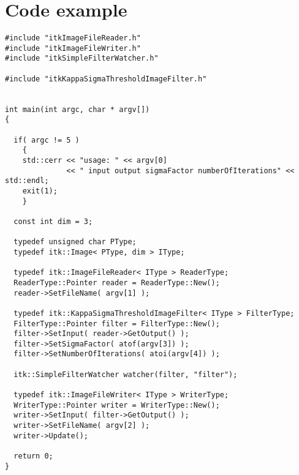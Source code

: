\documentclass{InsightArticle}
\begin{document}
\section{Code example}

\small \begin{verbatim}
#include "itkImageFileReader.h"
#include "itkImageFileWriter.h"
#include "itkSimpleFilterWatcher.h"

#include "itkKappaSigmaThresholdImageFilter.h"


int main(int argc, char * argv[])
{

  if( argc != 5 )
    {
    std::cerr << "usage: " << argv[0]
              << " input output sigmaFactor numberOfIterations" << std::endl;
    exit(1);
    }

  const int dim = 3;
  
  typedef unsigned char PType;
  typedef itk::Image< PType, dim > IType;

  typedef itk::ImageFileReader< IType > ReaderType;
  ReaderType::Pointer reader = ReaderType::New();
  reader->SetFileName( argv[1] );

  typedef itk::KappaSigmaThresholdImageFilter< IType > FilterType;
  FilterType::Pointer filter = FilterType::New();
  filter->SetInput( reader->GetOutput() );
  filter->SetSigmaFactor( atof(argv[3]) );
  filter->SetNumberOfIterations( atoi(argv[4]) );

  itk::SimpleFilterWatcher watcher(filter, "filter");

  typedef itk::ImageFileWriter< IType > WriterType;
  WriterType::Pointer writer = WriterType::New();
  writer->SetInput( filter->GetOutput() );
  writer->SetFileName( argv[2] );
  writer->Update();

  return 0;
}
\end{verbatim} \normalsize








\appendix





\nocite{ITKSoftwareGuide}
\end{document}
